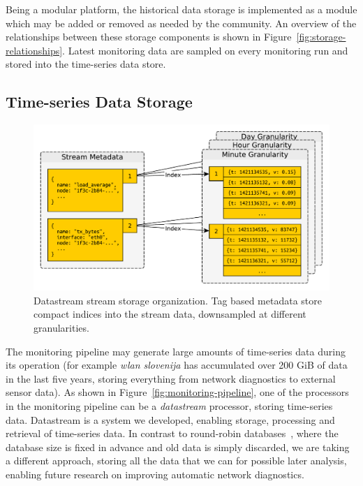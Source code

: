 \documentclass[5p,sort&compress]{elsarticle}
\newcommand{\wlanslovenija}{\textit{wlan slovenija}}
\begin{document}
Being a modular platform, the historical data storage is implemented as a module which may be added or removed as needed by the community.
An overview of the relationships between these storage components is shown in Figure~\ref{fig:storage-relationships}.
Latest monitoring data are sampled on every monitoring run and stored into the time-series data store.

\subsection{Time-series Data Storage}
\label{sec:time-series-data-storage}

\begin{figure}
  \centering
  \includegraphics[scale=0.4]{figures/datastream-storage.pdf}
  \caption{Datastream stream storage organization. Tag based metadata store compact indices into the stream data, downsampled at different granularities.}
  \label{fig:datastream-storage}
\end{figure}

The monitoring pipeline may generate large amounts of time-series data during its operation (for example \wlanslovenija{} has accumulated over 200 GiB of data in the last five years, storing everything from network diagnostics to external sensor data).
As shown in Figure~\ref{fig:monitoring-pipeline}, one of the processors in the monitoring pipeline can be a \textit{datastream} processor, storing time-series data.
Datastream is a system we developed, enabling storage, processing and retrieval of time-series data.
In contrast to round-robin databases~\cite{Oetiker_1999}, where the database size is fixed in advance and old data is simply discarded, we are taking a different approach, storing all the data that we can for possible later analysis, enabling future research on improving automatic network diagnostics.
\end{document}
